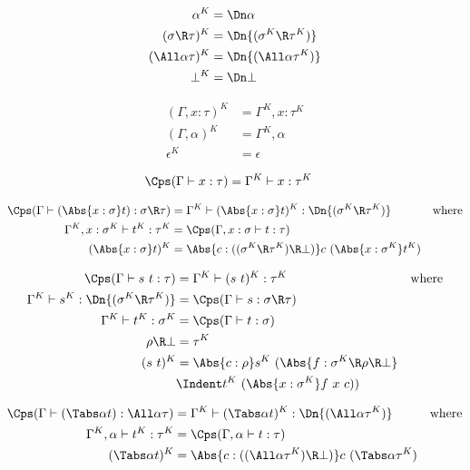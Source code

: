 \documentclass{amsart}
\begin{document}
\begin{align*}
\alpha^K & =
  \Dn\alpha
  \\
(\sigma \R \tau)^K & =
  \Dn{(\sigma^K \R \tau^K)}
  \\
(\All\alpha\tau)^K & =
  \Dn{(\All\alpha\tau^K)}
  \\
\bot^K & =
  \Dn\bot
\end{align*}

\begin{align*}
(\Gamma, x:\tau)^K & =
  \Gamma^K, x:\tau^K
  \\
(\Gamma, \alpha)^K & =
  \Gamma^K, \alpha
  \\
\epsilon^K & =
  \epsilon
\end{align*}

\begin{align*}
\Cps(\Gamma \vdash x : \tau) & =
  \Gamma^K \vdash x : \tau^K
\end{align*}

\begin{align*}
\Cps(\Gamma \vdash (\Abs{x:\sigma}t) : \sigma \R \tau) & =
  \Gamma^K \vdash (\Abs{x:\sigma}t)^K : \Dn{(\sigma^K \R \tau^K)} &
  \mbox{where}
  \\
\Gamma^K,x:\sigma^K \vdash t^K : \tau^K & =
  \Cps(\Gamma,x:\sigma \vdash t : \tau)
  \\
(\Abs{x:\sigma}t)^K & =
  \Abs{c : ((\sigma^K \R \tau^K) \R \bot)}c~(\Abs{x : \sigma^K} t^K)
\end{align*}

\begin{align*}
\Cps(\Gamma \vdash s~t : \tau) & =
  \Gamma^K \vdash (s~t)^K : \tau^K
  & \mbox{where}
  \\
\Gamma^K \vdash s^K : \Dn{(\sigma^K \R \tau^K)} & =
  \Cps(\Gamma \vdash s : \sigma \R \tau)
  \\
\Gamma^K \vdash t^K : \sigma^K & =
  \Cps(\Gamma \vdash t : \sigma)
  \\
\rho \R \bot & = \tau^K
  \\
(s~t)^K & =
  \Abs{c : \rho} s^K~(\Abs{f : \sigma^K \R \rho \R \bot} \\
  &\Indent t^K~(\Abs{x : \sigma^K} f~x~c))
\end{align*}

\begin{align*}
\Cps(\Gamma \vdash (\Tabs\alpha t) : \All\alpha \tau) & =
  \Gamma^K \vdash (\Tabs\alpha t)^K : \Dn{(\All\alpha \tau^K)}
  & \mbox{where}
  \\
\Gamma^K,\alpha \vdash t^K : \tau^K & =
  \Cps(\Gamma,\alpha \vdash t : \tau)
  \\
(\Tabs\alpha t)^K & =
  \Abs{c : ((\All\alpha \tau^K) \R \bot)}c~(\Tabs\alpha \tau^K)
\end{align*}
\end{document}

